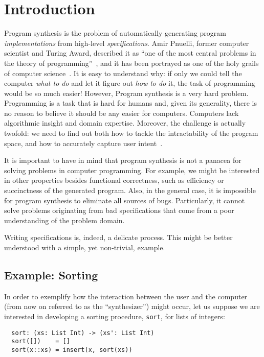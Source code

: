 \section{Introduction}
\label{sec:introduction}

Program synthesis is the problem of automatically generating program
\textit{implementations} from high-level \textit{specifications}.
Amir Pnuelli, former computer scientist and Turing Award, described it as ``one
of the most central problems in the theory of
programming''~\cite{Pnueli:1989:ARM}, and it has been portrayed as one of the
holy grails of computer science~\cite{Solar-Lezama:2008,Gulwani2017}.
It is easy to understand why: if only we could tell the computer \textit{what to
do} and let it figure out \textit{how to do} it, the task of programming would
be so much easier!
However, Program synthesis is a very hard problem.
Programming is a task that is hard for humans and, given its generality,
there is no reason to believe it should be any easier for computers.
Computers lack algorithmic insight and domain expertise.
Moreover, the challenge is actually twofold: we need to find out both how to
tackle the intractability of the program space, and how to accurately capture
user intent~\cite{Gulwani2017}.

It is important to have in mind that program synthesis is not a panacea for
solving problems in computer programming.
For example, we might be interested in other properties besides functional
correctness, such as efficiency or succinctness of the generated program.
Also, in the general case, it is impossible for program synthesis to eliminate
all sources of bugs.
Particularly, it cannot solve problems originating from bad specifications
that come from a poor understanding of the problem domain.

Writing specifications is, indeed, a delicate process.
This might be better understood with a simple, yet non-trivial, example.

\subsection{Example: Sorting}
\label{sec:sorting-example}

In order to exemplify how the interaction between the user and the computer
(from now on referred to as the ``synthesizer'') might occur, let us suppose we
are interested in developing a sorting procedure, \lstinline{sort}, for lists of
integers:

\begin{lstlisting}
  sort: (xs: List Int) -> (xs': List Int)
  sort([])    = []
  sort(x::xs) = insert(x, sort(xs))
\end{lstlisting}


